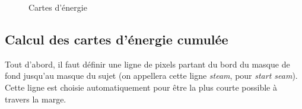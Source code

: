 \documentclass[a4paper]{article}
\begin{document}

\begin{figure}[!ht]%
    \centering
    \hspace{0.030\textwidth}
    \caption{Cartes d'énergie}
    \label{energie}
\end{figure}

\subsection{Calcul des cartes d'énergie cumulée}

Tout d'abord, il faut définir une ligne de pixels partant du bord du masque de fond jusqu'au masque du sujet (on appellera
cette ligne {\em steam}, pour {\em start seam}). %
Cette ligne est choisie automatiquement pour être la plus courte possible à travers la marge.
\end{document}

